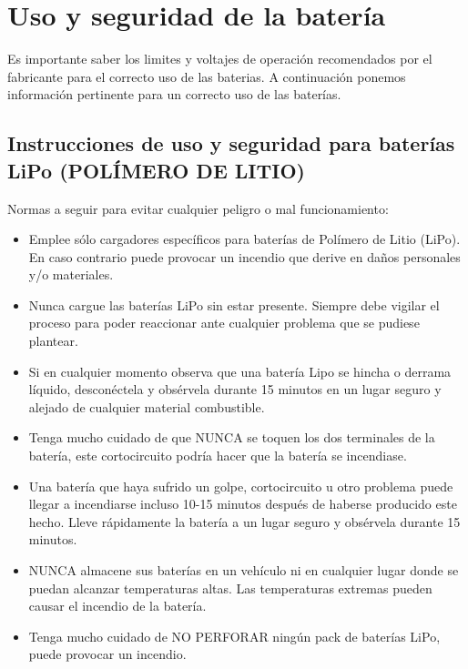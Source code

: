 \documentclass[user_manual.tex]{subfiles}
\begin{document}
\section{Uso y seguridad de la batería}

Es importante saber los limites y voltajes de operación recomendados por el fabricante para el correcto uso de las baterias. 
A continuación ponemos información pertinente para un correcto uso de las baterías.
\subsection{Instrucciones de uso y seguridad para baterías LiPo (POLÍMERO DE LITIO)}
Normas a seguir para evitar cualquier peligro o mal funcionamiento:

\begin{itemize}

    \item Emplee sólo cargadores específicos para baterías de Polímero de Litio (LiPo). En caso contrario puede provocar un 
    incendio que derive en daños personales y/o materiales.
    \item Nunca cargue las baterías LiPo sin estar presente. Siempre debe vigilar el proceso para poder reaccionar ante cualquier
    problema que se pudiese plantear.
    \item Si en cualquier momento observa que una batería Lipo se hincha o derrama líquido, desconéctela y obsérvela durante 15
    minutos en un lugar seguro y alejado de cualquier material combustible.
    \item Tenga mucho cuidado de que NUNCA se toquen los dos terminales de la batería, este cortocircuito podría hacer que la 
    batería se incendiase.
    \item Una batería que haya sufrido un golpe, cortocircuito u otro problema puede llegar a incendiarse incluso 10-15 minutos 
    después de haberse producido este hecho. Lleve rápidamente la batería a un lugar seguro y obsérvela durante 15 minutos.
    \item NUNCA almacene sus baterías en un vehículo ni en cualquier lugar donde se puedan alcanzar temperaturas altas. Las 
    temperaturas extremas pueden causar el incendio de la batería.
    \item Tenga mucho cuidado de NO PERFORAR ningún pack de baterías LiPo, puede provocar un incendio.
    \end{itemize}
    
\end{document}

